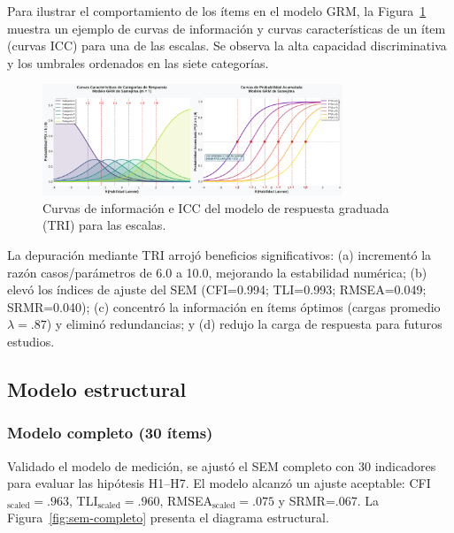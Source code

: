 Para ilustrar el comportamiento de los ítems en el modelo GRM, la Figura \ref{fig:irt} muestra un ejemplo de curvas de información y curvas características de un ítem (curvas ICC) para una de las escalas. Se observa la alta capacidad discriminativa y los umbrales ordenados en las siete categorías.

\begin{figure}[htbp]
\centering
\includegraphics[width=0.8\textwidth]{figures/grm_samejima.pdf}
\caption{Curvas de información e ICC del modelo de respuesta graduada (TRI) para las escalas.}
\label{fig:irt}
\end{figure}

La depuración mediante TRI arrojó beneficios significativos: (a) incrementó la razón casos/parámetros de 6.0 a 10.0, mejorando la estabilidad numérica; (b) elevó los índices de ajuste del SEM (CFI=0.994; TLI=0.993; RMSEA=0.049; SRMR=0.040); (c) concentró la información en ítems óptimos (cargas promedio $\lambda=.87$) y eliminó redundancias; y (d) redujo la carga de respuesta para futuros estudios.

\subsection{Modelo estructural}
\subsubsection*{Modelo completo (30 ítems)}
Validado el modelo de medición, se ajustó el SEM completo con 30 indicadores para evaluar las hipótesis H1–H7. El modelo alcanzó un ajuste aceptable: CFI$_{\text{scaled}}=.963$, TLI$_{\text{scaled}}=.960$, RMSEA$_{\text{scaled}}=.075$ y SRMR=.067. La Figura \ref{fig:sem-completo} presenta el diagrama estructural.

